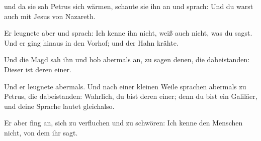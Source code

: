  und da sie sah Petrus sich wärmen, schaute sie ihn an
und sprach: Und du warst auch mit Jesus von Nazareth.

 Er leugnete aber und sprach: Ich kenne ihn nicht, weiß
auch nicht, was du sagst. Und er ging hinaus in den Vorhof; und der Hahn
krähte.

 Und die Magd sah ihn und hob abermals an, zu sagen
denen, die dabeistanden: Dieser ist deren einer.

 Und er leugnete abermals. Und nach einer kleinen Weile
sprachen abermals zu Petrus, die dabeistanden: Wahrlich, du bist deren
einer; denn du bist ein Galiläer, und deine Sprache lautet gleichalso.

 Er aber fing an, sich zu verfluchen und zu schwören: Ich
kenne den Menschen nicht, von dem ihr sagt.

